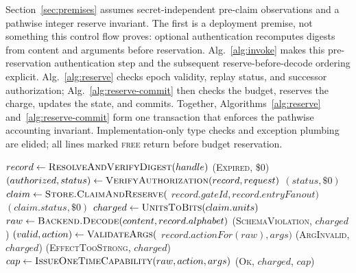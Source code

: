 \documentclass[conference,compsoc]{IEEEtran}
\begin{document}
{Section~\ref{sec:premises} assumes secret-independent pre-claim observations
and a pathwise integer reserve invariant. The first is a deployment premise,
not something this control flow proves: optional authentication recomputes
digests from content and arguments before reservation. {Alg.~\ref{alg:invoke} makes this pre-reservation authentication step and the subsequent reserve-before-decode ordering explicit. Alg.~\ref{alg:reserve} checks epoch validity, replay status, and successor authorization; Alg.~\ref{alg:reserve-commit} then checks the budget, reserves the charge, updates the state, and commits. Together, Algorithms~\ref{alg:reserve} and~\ref{alg:reserve-commit} form one transaction that enforces the pathwise accounting invariant.} Implementation-only type checks and exception plumbing are elided; all lines marked \textsc{free} return before budget reservation.

\begin{algorithm}[h]
\scriptsize
\caption{\texttt{invoke(handle, content, caller\_id, args)} -- the
mediation decision path}
\label{alg:invoke}
\begin{algorithmic}[1]
\State $record \gets \Call{ResolveAndVerifyDigest}{handle}$
 \Return (\textsc{Expired}, \$0) 
\EndIf
\State $(authorized,status) \gets
\Call{VerifyAuthorization}{record,request}$
  \State \Return $(status,\$0)$ 
\EndIf
\State $claim \gets \textsc{Store.ClaimAndReserve}($
\Statex \hspace{2em}$record.gateId, record.entryFanout)$
  \State \Return $(claim.status,\$0)$ 
\EndIf
\State $charged \gets \textproc{UnitsToBits}(claim.units)$
\State $raw \gets \Call{Backend.Decode}{content, record.alphabet}$
  \State \Return (\textsc{SchemaViolation}, $charged$)
\EndIf
\State $(valid, action) \gets \textsc{ValidateArgs}($
\Statex \hspace{2em}$record.actionFor(raw), args)$
 \Return (\textsc{ArgInvalid}, $charged$)
 \Return (\textsc{EffectTooStrong}, $charged$)
\EndIf
\State $cap \gets \Call{IssueOneTimeCapability}{raw, action, args}$ 
\State \Return (\textsc{Ok}, $charged$, $cap$)
\end{algorithmic}
\end{algorithm}

}
\end{document}
